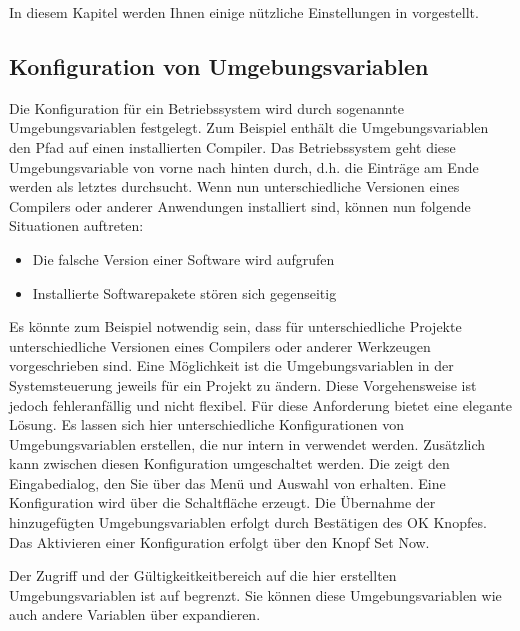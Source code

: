 In diesem Kapitel werden Ihnen einige nützliche Einstellungen in \codeblocks vorgestellt.

\subsection{Konfiguration von Umgebungsvariablen}

Die Konfiguration für ein Betriebssystem wird durch sogenannte Umgebungsvariablen festgelegt. Zum Beispiel enthält die Umgebungsvariablen  den Pfad auf einen installierten Compiler. Das Betriebssystem geht diese Umgebungsvariable von vorne nach hinten durch, d.h. die Einträge am Ende werden als letztes durchsucht. Wenn nun unterschiedliche Versionen eines Compilers oder anderer Anwendungen installiert sind, können nun folgende Situationen auftreten:

\begin{itemize}
\item Die falsche Version einer Software wird aufgrufen
\item Installierte Softwarepakete stören sich gegenseitig
\end{itemize}

Es könnte zum Beispiel notwendig sein, dass für unterschiedliche Projekte unterschiedliche Versionen eines Compilers oder anderer Werkzeugen vorgeschrieben sind. Eine Möglichkeit ist die Umgebungsvariablen in der Systemsteuerung jeweils für ein Projekt zu ändern. Diese Vorgehensweise ist jedoch fehleranfällig und nicht flexibel. Für diese Anforderung bietet \codeblocks eine elegante Lösung. Es lassen sich hier unterschiedliche Konfigurationen von Umgebungsvariablen erstellen, die nur intern in \codeblocks verwendet werden. Zusätzlich kann zwischen diesen Konfiguration umgeschaltet werden. Die  zeigt den Eingabedialog, den Sie über das Menü  und Auswahl von  erhalten. Eine Konfiguration wird über die Schaltfläche  erzeugt. Die Übernahme der hinzugefügten Umgebungsvariablen erfolgt durch Bestätigen des OK Knopfes. Das Aktivieren einer Konfiguration erfolgt über den Knopf Set Now.


Der Zugriff und der Gültigkeitkeitbereich auf die hier erstellten Umgebungsvariablen ist auf \codeblocks begrenzt. Sie können diese Umgebungsvariablen wie auch andere \codeblocks Variablen über  expandieren.

